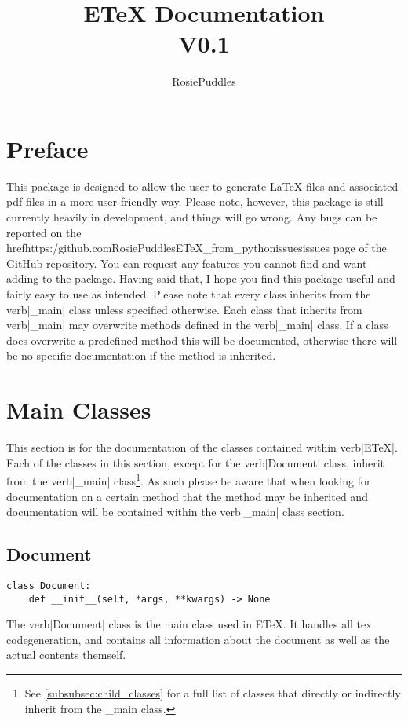 \documentclass{article}
\title{ETeX Documentation\\\large V0.1}
\date{}
\author{RosiePuddles}
\begin{document}
\maketitle
\tableofcontents
\newpage

\section{Preface}\label{sec:preface}
This package is designed to allow the user to generate LaTeX  files and associated pdf files in a more user friendly way. Please note, however, this package is still currently heavily in development, and things will go wrong. Any bugs can be reported on the href{https:/github.comRosiePuddlesETeX_from_pythonissues}{issues page} of the GitHub repository. You can request any features you cannot find and want adding to the package. Having said that, I hope you find this package useful and fairly easy to use as intended.
Please note that every class inherits from the verb|_main| class unless specified otherwise. Each class that inherits from verb|_main| may overwrite methods defined in the verb|_main| class. If a class does overwrite a predefined method this will be documented, otherwise there will be no specific documentation if the method is inherited.
\section{Main Classes}\label{sec:main_classes}
This section is for the documentation of the classes contained within verb|ETeX|.
Each of the classes in this section, except for the verb|Document| class, inherit from the verb|_main| class\footnote{See \autoref{subsubsec:child_classes} for a full list of classes that directly or indirectly inherit from the \_main class.}. As such please be aware that when looking for documentation on a certain method that the method may be inherited and documentation will be contained within the verb|_main| class section.
\subsection{Document}\label{subsec:document}
\begin{verbatim}
class Document:
	def __init__(self, *args, **kwargs) -> None
\end{verbatim}
The verb|Document| class is the main class used in ETeX. It handles all tex codegeneration, and contains all information about the document as well as the actual contents themself.
\end{document}

